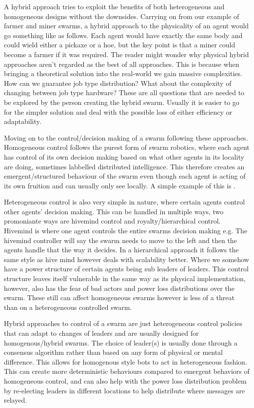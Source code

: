 \documentclass{UoYCSproject}
\begin{document}
A hybrid approach tries to exploit the benefits of both heterogeneous and homogeneous designs without the downsides. 
Carrying on from our example of farmer and miner swarms, a hybrid approach to the physicality of an agent would go something like as follows. 
Each agent would have exactly the same body and could wield either a pickaxe or a hoe, but the key point is that a miner could become a farmer if it was required. 
The reader might wonder why physical hybrid approaches aren’t regarded as the best of all approaches. 
This is because when bringing a theoretical solution into the real-world we gain massive complexities. 
How can we guarantee job type distribution? 
What about the complexity of changing between job type hardware? 
These are all questions that are needed to be explored by the person creating the hybrid swarm. 
Usually it is easier to go for the simpler solution and deal with the possible loss of either efficiency or adaptability.

Moving on to the control/decision making of a swarm following these approaches. 
Homogeneous control follows the purest form of swarm robotics, where each agent has control of its own decision making based on what other agents in its locality are doing, sometimes labbelled distributed intelligence. 
This therefore creates an emergent/structured behaviour of the swarm even though each agent is acting of its own fruition and can usually only see locally. 
A simple example of this is \cite{Boids}.

Heterogeneous control is also very simple in nature, where certain agents control other agents' decision making. 
This can be handled in multiple ways, two promoniante ways are hivemind control \cite{HiveMind} and royalty/hierarchical control. 
Hivemind is where one agent controls the entire swarms decision making e.g. The hivemind controller will say the swarm needs to move to the left and then the agents handle that the way it decides. 
In a hierarchical approach it follows the same style as hive mind however deals with scalability better. 
Where we somehow have a power structure of certain agents being sub leaders of leaders. 
This control structure leaves itself vulnerable in the same way as its physical implementation, however, also has the fear of bad actors and power loss distributions over the swarm. 
These still can affect homogeneous swarms however is less of a threat than on a heterogeneous controlled swarm.

Hybrid approaches to control of a swarm are just heterogeneous control policies that can adapt to changes of leaders and are usually designed for homogenous/hybrid swarms. 
The choice of leader(s) is usually done through a consensus algorithm \cite{Paxos} rather than based on any form of physical or mental difference. 
This allows for homogenous style bots to act in heterogeneous fashion. 
This can create more deterministic behaviours compared to emergent behaviors of homogeneous control, and can also help with the power loss distribution problem by re-electing leaders in different locations to help distribute where messages are relayed.
\end{document}
